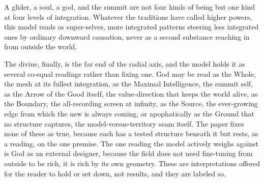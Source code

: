 \begin{principle}
A glider, a soul, a god, and the summit are not four kinds of being but one kind at four levels of integration. Whatever the traditions have called higher powers, this model reads as super-selves, more integrated patterns steering less integrated ones by ordinary downward causation, never as a second substance reaching in from outside the world.
\end{principle}

The divine, finally, is the far end of the radial axis, and the model holds it as several co-equal readings rather than fixing one. God may be read as the Whole, the mesh at its fullest integration, as the Maximal Intelligence, the summit self, as the Arrow of the Good itself, the value-direction that keeps the world alive, as the Boundary, the all-recording screen at infinity, as the Source, the ever-growing edge from which the new is always coming, or apophatically as the Ground that no structure captures, the model-versus-territory seam itself. The paper fixes none of these as true, because each has a tested structure beneath it but rests, as a reading, on the one premise. The one reading the model actively weighs against is God as an external designer, because the field does not need fine-tuning from outside to be rich, it is rich by its own geometry. These are interpretations offered for the reader to hold or set down, not results, and they are labeled so.
